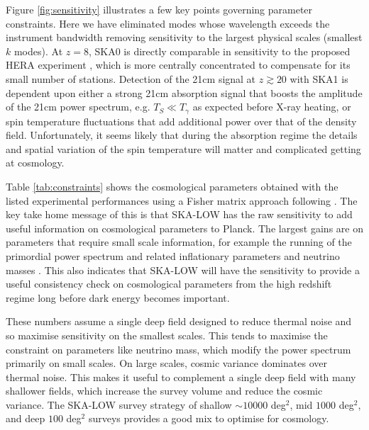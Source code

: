 \documentclass{PoS}
\begin{document}
Figure \ref{fig:sensitivity} illustrates a few key points governing parameter constraints. Here we have eliminated modes whose wavelength exceeds the instrument bandwidth removing sensitivity to the largest physical scales (smallest $k$ modes). At $z=8$, SKA0 is directly comparable in sensitivity to the proposed HERA experiment \citep{2014ApJ...782...66P}, which is more centrally concentrated to compensate for its small number of stations. Detection of the 21cm signal at $z\gtrsim20$ with SKA1 is dependent upon either a strong 21cm absorption signal that boosts the amplitude of the 21cm power spectrum, e.g. $T_S\ll T_\gamma$ as expected before X-ray heating, or spin temperature fluctuations that add additional power over that of the density field. Unfortunately, it seems likely that during the absorption regime the details and spatial variation of the spin temperature will matter and complicated getting at cosmology.

Table \ref{tab:constraints} shows the cosmological parameters obtained with the listed experimental performances using a Fisher matrix approach following \citet{2006ApJ...653..815M}. The key take home message of this is that SKA-LOW has the raw sensitivity to add useful information on cosmological parameters to Planck. The largest gains are on parameters that require small scale information, for example the running of the primordial power spectrum and related inflationary parameters \citep{2009PhLB..673..173B,2011JCAP...02..021A} and neutrino masses \citep{2008PhRvD..78f5009P}. This also indicates that SKA-LOW will have the sensitivity to provide a useful consistency check on cosmological parameters from the high redshift regime long before dark energy becomes important.

These numbers assume a single deep field designed to reduce thermal noise and so maximise sensitivity on the smallest scales. This tends to maximise the constraint on parameters like neutrino mass, which modify the power spectrum primarily on small scales. On large scales, cosmic variance dominates over thermal noise. This makes it useful to complement a single deep field with many shallower fields, which increase the survey volume and reduce the cosmic variance. The SKA-LOW survey strategy of shallow $\sim10000$ deg$^2$, mid $1000$ deg$^2$, and deep $100$ deg$^2$ surveys provides a good mix to optimise for cosmology.
\end{document}
